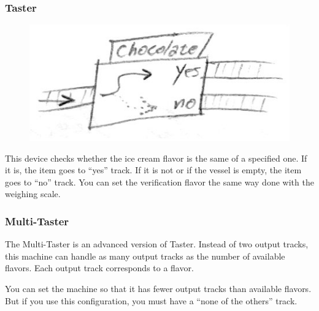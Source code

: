 \documentclass[a4paper]{scrartcl}
\begin{document}
        \subsubsection{Taster}
            \begin{minipage}[t][3em][t]{\textwidth}
                \begin{figure}
                    \vspace{-20pt}
                    \includegraphics[scale=1]{devices/taster}
                    \vspace{-20pt}
                \end{figure}

                This device checks whether the ice cream flavor is the same of a
                specified one. If it is, the item goes to ``yes'' track. If it
                is not or if the vessel is empty, the item goes to ``no'' track.
                You can set the verification flavor the same way done with the
                weighing scale.
            \end{minipage}

        \subsubsection{Multi-Taster}
            The Multi-Taster is an advanced version of Taster. Instead of two
            output tracks, this machine can handle as many output tracks as the
            number of available flavors. Each output track corresponds to a
            flavor.

            You can set the machine so that it has fewer output tracks than
            available flavors. But if you use this configuration, you must have
            a ``none of the others'' track.
\end{document}
